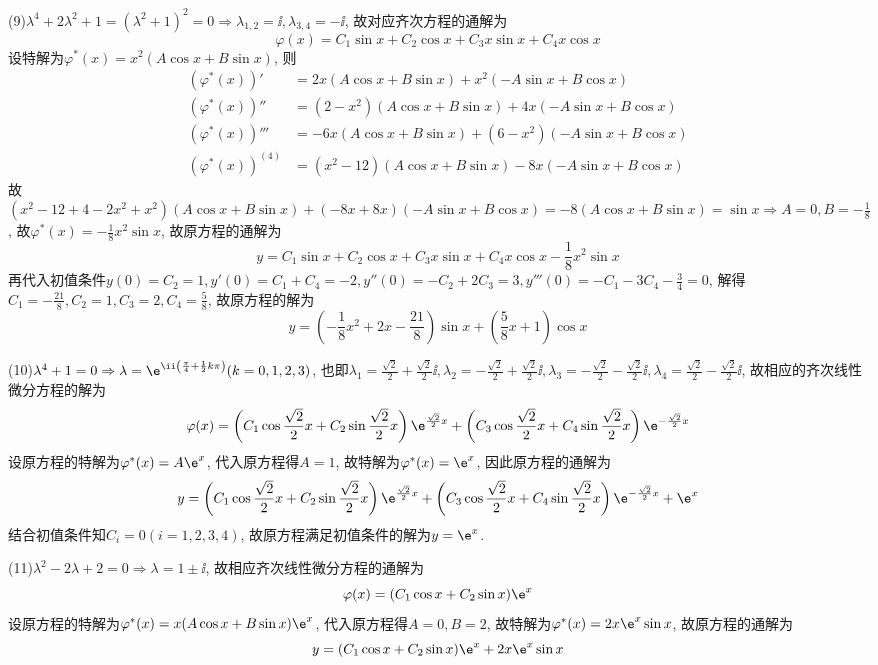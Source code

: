 \begin{solve}
(9)$\lambda^4+2\lambda^2+1=(\lambda^2+1)^2=0\Rightarrow\lambda_{1,2}=\ii,\lambda_{3,4}=-\ii$, 故对应齐次方程的通解为
\[\varphi(x)=C_1\sin x+C_2\cos x+C_3x\sin x+C_4x\cos x\]
设特解为$\varphi^*(x)=x^2(A\cos x+B\sin x)$, 则
\[\begin{split}
\left(\varphi^*(x)\right)'&=2x(A\cos x+B\sin x)+x^2(-A\sin x+B\cos x)\\
\left(\varphi^*(x)\right)''&=(2-x^2)(A\cos x+B\sin x)+4x(-A\sin x+B\cos x)\\
\left(\varphi^*(x)\right)'''&=-6x(A\cos x+B\sin x)+(6-x^2)(-A\sin x+B\cos x)\\
\left(\varphi^*(x)\right)^{(4)}&=(x^2-12)(A\cos x+B\sin x)-8x(-A\sin x+B\cos x)
\end{split}\]
故$(x^2-12+4-2x^2+x^2)(A\cos x+B\sin x)+(-8x+8x)(-A\sin x+B\cos x)=-8(A\cos x+B\sin x)=\sin x\Rightarrow A=0,B=-\frac{1}{8}$, 
故$\varphi^*(x)=-\frac{1}{8}x^2\sin x$, 故原方程的通解为
\[y=C_1\sin x+C_2\cos x+C_3x\sin x+C_4x\cos x-\frac{1}{8}x^2\sin x\]
再代入初值条件$y(0)=C_2=1,y'(0)=C_1+C_4=-2,y''(0)=-C_2+2C_3=3,y'''(0)=-C_1-3C_4-\frac{3}{4}=0$, 
解得$C_1=-\frac{21}{8},C_2=1,C_3=2,C_4=\frac{5}{8}$, 故原方程的解为
\[y=\left(-\frac{1}{8}x^2+2x-\frac{21}{8}\right)\sin x+\left(\frac{5}{8}x+1\right)\cos x\]

(10)$\lambda^4+1=0\Rightarrow\lambda=\e^{\ii\left(\frac{\pi}{4}+\frac{1}{2}k\pi\right)}(k=0,1,2,3)$, 
也即$\lambda_1=\frac{\sqrt{2}}{2}+\frac{\sqrt{2}}{2}\ii,\lambda_2=-\frac{\sqrt{2}}{2}+\frac{\sqrt{2}}{2}\ii,\lambda_3=-\frac{\sqrt{2}}{2}-\frac{\sqrt{2}}{2}\ii,\lambda_4=\frac{\sqrt{2}}{2}-\frac{\sqrt{2}}{2}\ii$, 
故相应的齐次线性微分方程的解为
\[\varphi(x)=\left(C_1\cos\frac{\sqrt{2}}{2}x+C_2\sin\frac{\sqrt{2}}{2}x\right)\e^{\frac{\sqrt{2}}{2}x}+\left(C_3\cos\frac{\sqrt{2}}{2}x+C_4\sin\frac{\sqrt{2}}{2}x\right)\e^{-\frac{\sqrt{2}}{2}x}\]
设原方程的特解为$\varphi^*(x)=A\e^x$, 代入原方程得$A=1$, 故特解为$\varphi^*(x)=\e^x$, 因此原方程的通解为
\[y=\left(C_1\cos\frac{\sqrt{2}}{2}x+C_2\sin\frac{\sqrt{2}}{2}x\right)\e^{\frac{\sqrt{2}}{2}x}+\left(C_3\cos\frac{\sqrt{2}}{2}x+C_4\sin\frac{\sqrt{2}}{2}x\right)\e^{-\frac{\sqrt{2}}{2}x}+\e^x\]
结合初值条件知$C_i=0(i=1,2,3,4)$, 故原方程满足初值条件的解为$y=\e^x$.

(11)$\lambda^2-2\lambda+2=0\Rightarrow\lambda=1\pm\ii$, 故相应齐次线性微分方程的通解为
\[\varphi(x)=(C_1\cos x+C_2\sin x)\e^x\]
设原方程的特解为$\varphi^*(x)=x(A\cos x+B\sin x)\e^x$, 代入原方程得$A=0,B=2$, 故特解为$\varphi^*(x)=2x\e^x\sin x$, 故原方程的通解为
\[y=(C_1\cos x+C_2\sin x)\e^x+2x\e^x\sin x\]


\end{solve}
